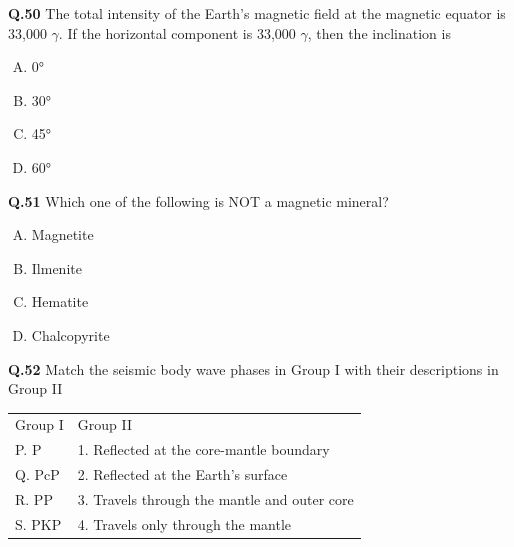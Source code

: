 
\textbf{Q.50} The total intensity of the Earth's magnetic field at the magnetic equator is 33,000 $\gamma$. If the horizontal component is 33,000 $\gamma$, then the inclination is
\begin{multicols}{4}
    

\begin{enumerate}[(A)]
    \item 0°
    \item 30°
    \item 45°
    \item 60°
\end{enumerate}
\end{multicols}
\textbf{Q.51} Which one of the following is NOT a magnetic mineral?
\begin{enumerate}[(A)]
    \item Magnetite
    \item Ilmenite
    \item Hematite
    \item Chalcopyrite
\end{enumerate}

\textbf{Q.52} Match the seismic body wave phases in Group I with their descriptions in Group II  

\begin{center}
\begin{tabular}{ll}
Group I & Group II \\
P. P & 1. Reflected at the core-mantle boundary \\
Q. PcP & 2. Reflected at the Earth's surface \\
R. PP & 3. Travels through the mantle and outer core \\
S. PKP & 4. Travels only through the mantle \\
\end{tabular}
\end{center}

